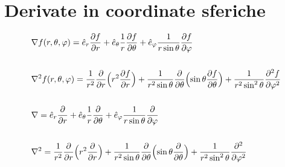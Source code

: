 \documentclass[11pt, a4paper]{scrartcl} %
\numberwithin{equation}{section}
\theoremstyle{style2}
\theoremstyle{style1}
\begin{document}
\section{Derivate in coordinate sferiche}
	\[
		\begin{split}
			&\nabla f(r,\theta,\varphi)= \hat{e}_r \frac{\partial f}{\partial r}
+ \hat{e}_\theta \frac{1}{r} \frac{\partial f}{\partial \theta}+ \hat{e}_\varphi \frac{1}{r \sin\theta} \frac{\partial f}{\partial \varphi}\\
\\
			&\nabla^2 f(r,\theta,\varphi) = \frac{1}{r^2} \frac{\partial}{\partial r}\Bigl(r^2 \frac{\partial f}{\partial r}\Bigr) + \frac{1}{r^2 \sin\theta} \frac{\partial}{\partial \theta}\Bigl(\sin\theta \frac{\partial f}{\partial \theta}\Bigr) + \frac{1}{r^2 \sin^2\theta} \frac{\partial^2 f}{\partial \varphi^2}\\
			\\
			&\nabla = \hat{e}_r \frac{\partial}{\partial r} + \hat{e}_\theta \frac{1}{r} \frac{\partial}{\partial \theta} + \hat{e}_\varphi \frac{1}{r \sin\theta} \frac{\partial}{\partial \varphi}\\
			\\
			&\nabla^2 = \frac{1}{r^2} \frac{\partial}{\partial r}\Bigl(r^2 \frac{\partial}{\partial r}\Bigr) + \frac{1}{r^2 \sin\theta} \frac{\partial}{\partial \theta}\Bigl(\sin\theta \frac{\partial}{\partial \theta}\Bigr) + \frac{1}{r^2 \sin^2\theta} \frac{\partial^2}{\partial \varphi^2}
		\end{split}
\]
\end{document}
